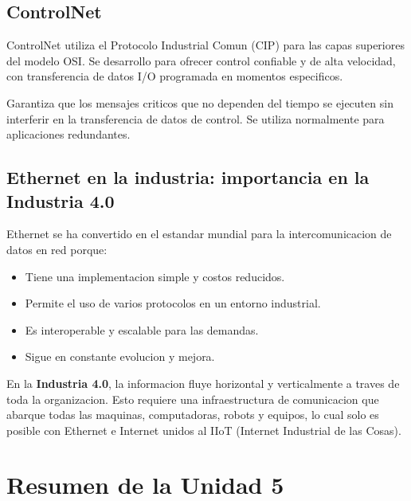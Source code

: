 \subsection{ControlNet}

ControlNet utiliza el Protocolo Industrial Comun (CIP) para las capas superiores
del modelo OSI. Se desarrollo para ofrecer control confiable y de alta velocidad,
con transferencia de datos I/O programada en momentos especificos.

Garantiza que los mensajes criticos que no dependen del tiempo se ejecuten sin
interferir en la transferencia de datos de control. Se utiliza normalmente para
aplicaciones redundantes.

\subsection{Ethernet en la industria: importancia en la Industria 4.0}

Ethernet se ha convertido en el estandar mundial para la intercomunicacion de
datos en red porque:
\begin{itemize}
    \item Tiene una implementacion simple y costos reducidos.
    \item Permite el uso de varios protocolos en un entorno industrial.
    \item Es interoperable y escalable para las demandas.
    \item Sigue en constante evolucion y mejora.
\end{itemize}

En la \textbf{Industria 4.0}, la informacion fluye horizontal y verticalmente a traves
de toda la organizacion. Esto requiere una infraestructura de comunicacion que
abarque todas las maquinas, computadoras, robots y equipos, lo cual solo es
posible con Ethernet e Internet unidos al IIoT (Internet Industrial de las Cosas).


\section{Resumen de la Unidad 5}

